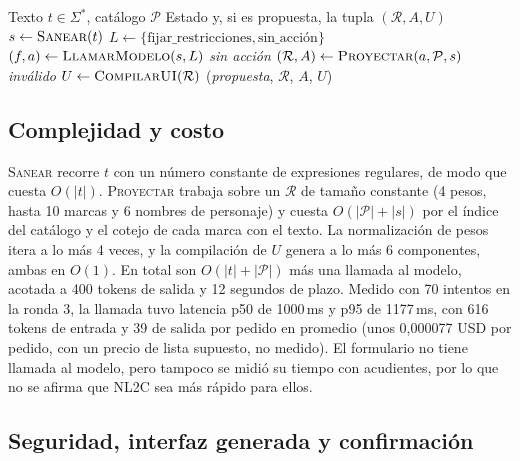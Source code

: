 \documentclass[11pt,letterpaper]{article}
\newcommand{\R}{\mathcal{R}}
\begin{document}
\begin{algorithm}[ht]
\caption{\textsc{Interpretar}$(t,\mathcal{P})$}\label{alg:interpretar}
\begin{algorithmic}[1]
\Require Texto $t\in\Sigma^{*}$, cat\'alogo $\mathcal{P}$
\Ensure Estado y, si es propuesta, la tupla $(\R,A,U)$
\State $s\gets \textsc{Sanear}(t)$ 
\State $L\gets\{\text{fijar\_restricciones},\text{sin\_acci\'on}\}$ 
\State $(f,a)\gets \textsc{LlamarModelo}(s,L)$ 
 \State \Return \emph{sin acci\'on} \EndIf
\State $(\R,A)\gets \textsc{Proyectar}(a,\mathcal{P},s)$ 
 \State \Return \emph{inv\'alido} \EndIf
\State $U\gets \textsc{CompilarUI}(\R)$ 
\State \Return (\emph{propuesta}, $\R$, $A$, $U$) 
\end{algorithmic}
\end{algorithm}

\subsection{Complejidad y costo}

\textsc{Sanear} recorre $t$ con un n\'umero constante de expresiones regulares, de modo que cuesta $O(|t|)$. \textsc{Proyectar}
trabaja sobre un $\R$ de tama\~no constante (4 pesos, hasta 10 marcas y 6 nombres de personaje) y cuesta
$O(|\mathcal{P}|+|s|)$ por el \'indice del cat\'alogo y el cotejo de cada marca con el texto. La normalizaci\'on de pesos itera
a lo m\'as 4 veces, y la compilaci\'on de $U$ genera a lo m\'as 6 componentes, ambas en $O(1)$. En total son
$O(|t|+|\mathcal{P}|)$ m\'as una llamada al modelo, acotada a 400 tokens de salida y 12 segundos de plazo. Medido con 70 intentos
en la ronda 3, la llamada tuvo latencia p50 de 1000\,ms y p95 de 1177\,ms, con 616 tokens de entrada y 39 de salida por pedido en
promedio (unos 0,000077 USD por pedido, con un precio de lista supuesto, no medido). El formulario no tiene llamada al modelo, pero
tampoco se midi\'o su tiempo con acudientes, por lo que no se afirma que NL2C sea m\'as r\'apido para ellos.

\subsection{Seguridad, interfaz generada y confirmaci\'on}
\end{document}
